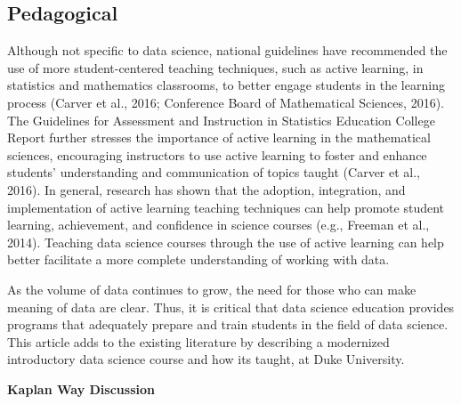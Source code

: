 \documentclass[
  12pt]{article}
\begin{document}
\hypertarget{sec-ped}{%
\subsection{Pedagogical}\label{sec-ped}}

Although not specific to data science, national guidelines have
recommended the use of more student-centered teaching techniques, such
as active learning, in statistics and mathematics classrooms, to better
engage students in the learning process (Carver et al., 2016; Conference
Board of Mathematical Sciences, 2016). The Guidelines for Assessment and
Instruction in Statistics Education College Report further stresses the
importance of active learning in the mathematical sciences, encouraging
instructors to use active learning to foster and enhance students'
understanding and communication of topics taught (Carver et al., 2016).
In general, research has shown that the adoption, integration, and
implementation of active learning teaching techniques can help promote
student learning, achievement, and confidence in science courses (e.g.,
Freeman et al., 2014). Teaching data science courses through the use of
active learning can help better facilitate a more complete understanding
of working with data.

As the volume of data continues to grow, the need for those who can make
meaning of data are clear. Thus, it is critical that data science
education provides programs that adequately prepare and train students
in the field of data science. This article adds to the existing
literature by describing a modernized introductory data science course
and how its taught, at Duke University.

\textbf{Kaplan Way Discussion}


  
\end{document}
